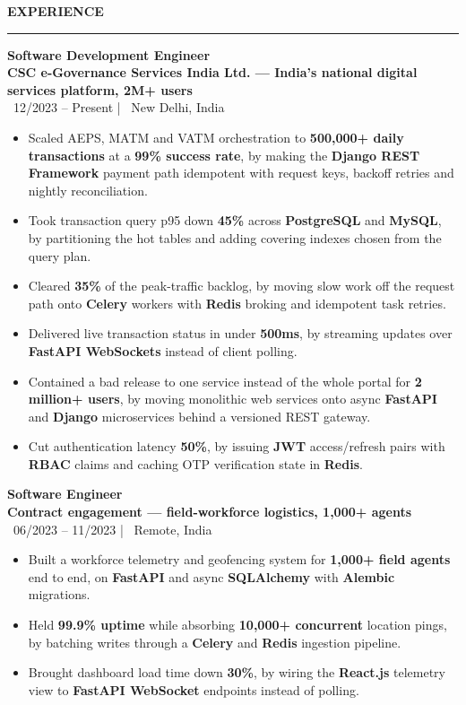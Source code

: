 \documentclass[10pt]{article}
\newcommand{\resumesection}[1]{%
  \vspace{6pt}%
  {\fontfamily{phv}\selectfont\textbf{\large\MakeUppercase{#1}}}%
  \vspace{2pt}%
  \hrule%
  \vspace{4pt}%
}
\begin{document}
\resumesection{Experience}
{\textbf{Software Development Engineer}} \\
{\textbf{\textcolor{primaryblue}{CSC e-Governance Services India Ltd. --- India's national digital services platform, 2M+ users}}} \\
{\footnotesize\textcolor{primaryblue}{\faCalendar*}~12/2023 -- Present \quad | \quad \textcolor{primaryblue}{\faMapMarker*}~New Delhi, India}
\begin{itemize}
    \item Scaled AEPS, MATM and VATM orchestration to \textbf{500,000+ daily transactions} at a \textbf{99\% success rate}, by making the \textbf{Django REST Framework} payment path idempotent with request keys, backoff retries and nightly reconciliation.
    \item Took transaction query p95 down \textbf{45\%} across \textbf{PostgreSQL} and \textbf{MySQL}, by partitioning the hot tables and adding covering indexes chosen from the query plan.
    \item Cleared \textbf{35\%} of the peak-traffic backlog, by moving slow work off the request path onto \textbf{Celery} workers with \textbf{Redis} broking and idempotent task retries.
    \item Delivered live transaction status in under \textbf{500ms}, by streaming updates over \textbf{FastAPI WebSockets} instead of client polling.
    \item Contained a bad release to one service instead of the whole portal for \textbf{2 million+ users}, by moving monolithic web services onto async \textbf{FastAPI} and \textbf{Django} microservices behind a versioned REST gateway.
    \item Cut authentication latency \textbf{50\%}, by issuing \textbf{JWT} access/refresh pairs with \textbf{RBAC} claims and caching OTP verification state in \textbf{Redis}.
\end{itemize}

\vspace{4pt}
{\textbf{Software Engineer}} \\
{\textbf{\textcolor{primaryblue}{Contract engagement --- field-workforce logistics, 1,000+ agents}}} \\
{\footnotesize\textcolor{primaryblue}{\faCalendar*}~06/2023 -- 11/2023 \quad | \quad \textcolor{primaryblue}{\faMapMarker*}~Remote, India}
\begin{itemize}
    \item Built a workforce telemetry and geofencing system for \textbf{1,000+ field agents} end to end, on \textbf{FastAPI} and async \textbf{SQLAlchemy} with \textbf{Alembic} migrations.
    \item Held \textbf{99.9\% uptime} while absorbing \textbf{10,000+ concurrent} location pings, by batching writes through a \textbf{Celery} and \textbf{Redis} ingestion pipeline.
    \item Brought dashboard load time down \textbf{30\%}, by wiring the \textbf{React.js} telemetry view to \textbf{FastAPI WebSocket} endpoints instead of polling.
\end{itemize}
\end{document}
